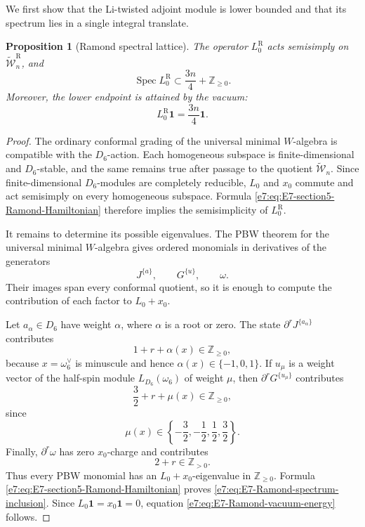 \documentclass[11pt,reqno]{amsart}
\newtheorem{proposition}[theorem]{Proposition}
\theoremstyle{definition}
\theoremstyle{remark}
\begin{document}
We first show that the Li-twisted adjoint module is lower bounded and that
its spectrum lies in a single integral translate.

\begin{proposition}[Ramond spectral lattice]
\label{e7:prop:E7-Ramond-spectral-lattice}
The operator \(L_0^{\mathrm R}\) acts semisimply on
\(\widetilde{\mathcal W}_n^{\mathrm R}\), and
\begin{equation}
  \operatorname{Spec}L_0^{\mathrm R}
  \subset
  \frac{3n}{4}+\mathbb Z_{\ge0}.
  \label{e7:eq:E7-Ramond-spectrum-inclusion}
\end{equation}
Moreover, the lower endpoint is attained by the vacuum:
\begin{equation}
  L_0^{\mathrm R}\mathbf1
  =\frac{3n}{4}\mathbf1.
  \label{e7:eq:E7-Ramond-vacuum-energy}
\end{equation}
\end{proposition}

\begin{proof}
The ordinary conformal grading of the universal minimal \(W\)-algebra is
compatible with the \(D_6\)-action.  Each homogeneous subspace is
finite-dimensional and \(D_6\)-stable, and the same remains true after
passage to the quotient \(\widetilde{\mathcal W}_n\).  Since finite-dimensional
\(D_6\)-modules are completely reducible, \(L_0\) and \(x_0\) commute and
act semisimply on every homogeneous subspace.  Formula
\eqref{e7:eq:E7-section5-Ramond-Hamiltonian} therefore implies the
semisimplicity of \(L_0^{\mathrm R}\).

It remains to determine its possible eigenvalues.  The PBW theorem for the
universal minimal \(W\)-algebra gives ordered monomials in derivatives of
the generators
\[
  J^{\{a\}},\qquad G^{\{u\}},\qquad\omega.
\]
Their images span every conformal quotient, so it is enough to compute the
contribution of each factor to \(L_0+x_0\).

Let \(a_\alpha\in D_6\) have weight \(\alpha\), where \(\alpha\) is a root
or zero.  The state \(\partial^rJ^{\{a_\alpha\}}\) contributes
\begin{equation*}
  1+r+\alpha(x)
  \in\mathbb Z_{\ge0},
\end{equation*}
because \(x=\omega_6^\vee\) is minuscule and hence
\(\alpha(x)\in\{-1,0,1\}\).  If \(u_\mu\) is a weight vector of the
half-spin module \(L_{D_6}(\omega_6)\) of weight \(\mu\), then
\(\partial^rG^{\{u_\mu\}}\) contributes
\begin{equation*}
  \frac32+r+\mu(x)
  \in\mathbb Z_{\ge0},
\end{equation*}
since
\[
  \mu(x)\in
  \left\{-\frac32,-\frac12,\frac12,\frac32\right\}.
\]
Finally, \(\partial^r\omega\) has zero \(x_0\)-charge and contributes
\begin{equation*}
  2+r\in\mathbb Z_{>0}.
\end{equation*}
Thus every PBW monomial has an \(L_0+x_0\)-eigenvalue in
\(\mathbb Z_{\ge0}\).  Formula
\eqref{e7:eq:E7-section5-Ramond-Hamiltonian} proves
\eqref{e7:eq:E7-Ramond-spectrum-inclusion}.  Since
\(L_0\mathbf1=x_0\mathbf1=0\), equation
\eqref{e7:eq:E7-Ramond-vacuum-energy} follows.
\end{proof}
\end{document}
